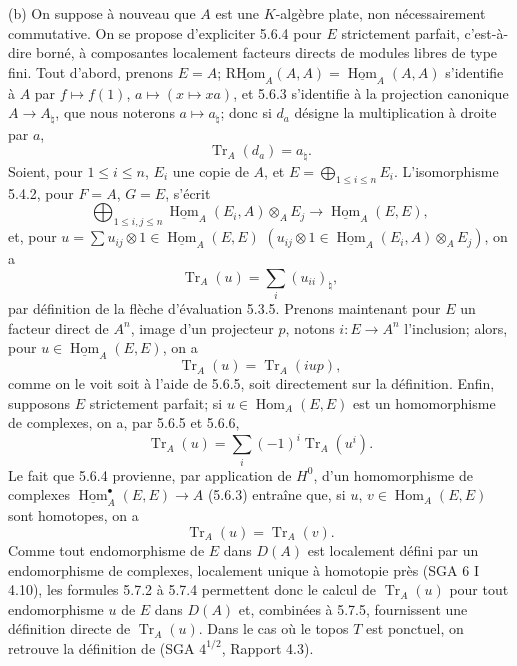\documentclass[11pt]{article}
\DeclareMathOperator{\Hom}{Hom}
\newcommand{\R}{\mathrm{R}}\newcommand{\RHomCore}{\mathrm{RHom}}
\providecommand{\RHom}{\RHomCore}
\providecommand{\uRHom}{\underline{\RHom}}
\providecommand{\uHom}{\underline{\Hom}}
\providecommand{\Tr}{\operatorname{Tr}}
\providecommand{\Tr}{\operatorname{Tr}}
\providecommand{\Tr}{\operatorname{Tr}}
\providecommand{\RHom}{\RHomCore}
\providecommand{\Hom}{\operatorname{Hom}}
\providecommand{\RHom}{\R\mathcal{H}om}
\providecommand{\R}{\mathrm R}
\providecommand{\Tr}{\operatorname{Tr}}
\providecommand{\RHom}{\RHomCore}
\providecommand{\Hom}{\operatorname{Hom}}
\providecommand{\Tr}{\operatorname{Tr}}
\begin{document}
(b) On suppose à nouveau que $A$ est une $K$-algèbre plate, non nécessairement commutative. On se propose d'expliciter 5.6.4 pour $E$ strictement parfait, c'est-à-dire borné, à composantes localement facteurs directs de modules libres de type fini. Tout d'abord, prenons $E=A$; $\uRHom_A(A,A)=\uHom_A(A,A)$ s'identifie à $A$ par $f\mapsto f(1)$, $a\mapsto(x\mapsto xa)$, et 5.6.3 s'identifie à la projection canonique $A\to A_\natural$, que nous noterons $a\mapsto a_\natural$; donc si $d_a$ désigne la multiplication à droite par $a$,
\begin{equation}\tag{5.7.1}
\Tr_A(d_a)=a_\natural.
\end{equation}
Soient, pour $1\le i\le n$, $E_i$ une copie de $A$, et $E=\bigoplus_{1\le i\le n}E_i$. L'isomorphisme 5.4.2, pour $F=A$, $G=E$, s'écrit
\[
\bigoplus_{1\le i,j\le n}\uHom_A(E_i,A)\otimes_AE_j\longrightarrow\uHom_A(E,E),
\]
et, pour $u=\sum u_{ij}\otimes 1\in\uHom_A(E,E)$ $(u_{ij}\otimes 1\in\uHom_A(E_i,A)\otimes_A E_j)$, on a
\begin{equation}\tag{5.7.2}
\Tr_A(u)=\sum_i (u_{ii})_\natural,
\end{equation}
par définition de la flèche d'évaluation 5.3.5. Prenons maintenant pour $E$ un facteur direct de $A^n$, image d'un projecteur $p$, notons $i:E\to A^n$ l'inclusion; alors, pour $u\in\uHom_A(E,E)$, on a
\begin{equation}\tag{5.7.3}
\Tr_A(u)=\Tr_A(iup),
\end{equation}
comme on le voit soit à l'aide de 5.6.5, soit directement sur la définition. Enfin, supposons $E$ strictement parfait; si $u\in\Hom_A(E,E)$ est un homomorphisme de complexes, on a, par 5.6.5 et 5.6.6,
\begin{equation}\tag{5.7.4}
\Tr_A(u)=\sum_i(-1)^i\Tr_A(u^i).
\end{equation}
Le fait que 5.6.4 provienne, par application de $H^0$, d'un homomorphisme de complexes $\uHom_A^\bullet(E,E)\to A$ (5.6.3) entraîne que, si $u$, $v\in\Hom_A(E,E)$ sont homotopes, on a
\begin{equation}\tag{5.7.5}
\Tr_A(u)=\Tr_A(v).
\end{equation}
Comme tout endomorphisme de $E$ dans $D(A)$ est localement défini par un endomorphisme de complexes, localement unique à homotopie près (SGA 6 I 4.10), les formules 5.7.2 à 5.7.4 permettent donc le calcul de $\Tr_A(u)$ pour tout endomorphisme $u$ de $E$ dans $D(A)$ et, combinées à 5.7.5, fournissent une définition directe de $\Tr_A(u)$. Dans le cas où le topos $T$ est ponctuel, on retrouve la définition de (SGA $4^{1/2}$, Rapport 4.3).
\end{document}
